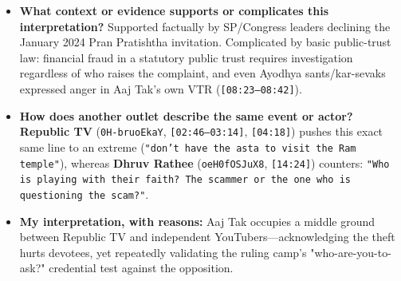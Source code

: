 \documentclass[10pt,a4paper]{article}
\begin{document}
\begin{itemize}[leftmargin=1.5em, itemsep=3pt, topsep=4pt]
  \item \textbf{What context or evidence supports or complicates this interpretation?} Supported factually by SP/Congress leaders declining the January 2024 Pran Pratishtha invitation. Complicated by basic public-trust law: financial fraud in a statutory public trust requires investigation regardless of who raises the complaint, and even Ayodhya sants/kar-sevaks expressed anger in Aaj Tak's own VTR (\texttt{[08:23--08:42]}).
  \item \textbf{How does another outlet describe the same event or actor?} \textbf{Republic TV} (\texttt{0H-bruoEkaY}, \texttt{[02:46--03:14]}, \texttt{[04:18]}) pushes this exact same line to an extreme (\texttt{"don't have the asta to visit the Ram temple"}), whereas \textbf{Dhruv Rathee} (\texttt{oeH0fOSJuX8}, \texttt{[14:24]}) counters: \texttt{"Who is playing with their faith? The scammer or the one who is questioning the scam?"}.
  \item \textbf{My interpretation, with reasons:} Aaj Tak occupies a middle ground between Republic TV and independent YouTubers---acknowledging the theft hurts devotees, yet repeatedly validating the ruling camp's "who-are-you-to-ask?" credential test against the opposition.
\end{itemize}
\end{document}
